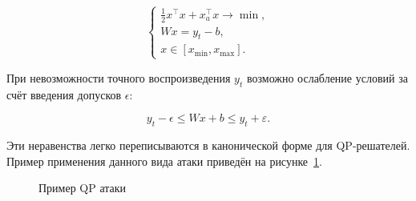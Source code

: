 \[
\begin{cases}
    \frac{1}{2} x^\top x + x_a^\top x \rightarrow \min,\\
    Wx = y_t - b,\\
    x \in [x_{\min}, x_{\max}].
\end{cases}
\]

При невозможности точного воспроизведения \(y_t\) возможно ослабление условий за счёт введения допусков \(\epsilon\):

\[
y_t - \epsilon \leq Wx + b \leq y_t + \varepsilon.
\]

Эти неравенства легко переписываются в канонической форме для QP-решателей. Пример применения данного вида атаки приведён на рисунке~\cref{fig:qp_attack_example}.

\begin{figure}[ht]
    \caption{Пример QP атаки}
    \label{fig:qp_attack_example}
\end{figure}

